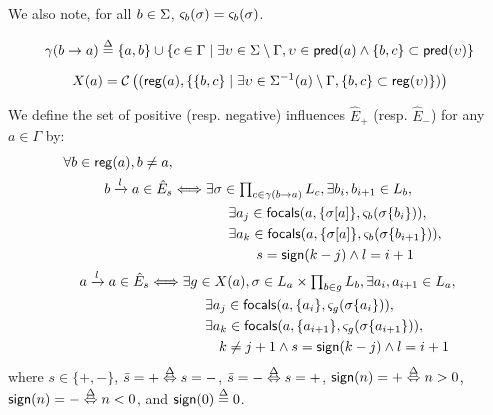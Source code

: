 We also note, for all $b \in \Sigma$, $\varsigma_{b}(\sigma) = \varsigma_b(\sigma)$.

\begin{equation}
\gamma(b\rightarrow a)  \stackrel{\Delta}= \{ a, b \} \cup \{ c \in \Gamma \mid
                        \exists \upsilon\in\Sigma\setminus\Gamma,
                                \upsilon\in\mathsf{pred}(a) \wedge \{b,c\}\subset\mathsf{pred}(\upsilon) \}
\label{eq:cooperating-with-b}
\end{equation}

\begin{equation}
X(a) = \mathcal C\left( (\mathsf{reg}({a}), \{ \{b,c\} \mid
                                \exists \upsilon\in \Sigma^{-1}(a) \setminus \Gamma,
                                        \{b,c\} \subset \mathsf{reg}({\upsilon}) \}) \right)
\label{eq:influence-groups}
\end{equation}


\begin{proposition}\label{pps:inference-edges}
We define the set of positive (resp. negative) influences $\hat{E}_+$ (resp. $\hat{E}_-$) for any
$a\in\Gamma$ by:
\begin{align}
\begin{split}
\forall b\in\mathsf{reg}({a}), b\neq a, \\
b\xrightarrow l a \in \hat{E}_s & \Longleftrightarrow
 \exists \sigma\in\textstyle\prod_{c\in\gamma(b\rightarrow a)} L_c, \exists b_i,b_{i+1}\in L_b,\\
& \qquad\qquad
        \exists a_{j}\in\mathsf{focals}(a, \{\sigma[a]\}, \varsigma_b(\sigma\{b_i\})), \\
& \qquad\qquad
        \exists a_{k}\in\mathsf{focals}(a, \{\sigma[a]\}, \varsigma_b(\sigma\{b_{i+1}\})), \\
& \qquad\qquad\qquad
                        s = \mathsf{sign}(k - j) \wedge l = i+1
\end{split}
\label{eq:edges-inference-b}
\\
\begin{split}
a \xrightarrow l a \in \hat{E}_s & \Longleftrightarrow
\exists g \in X(a), \sigma \in L_a\times \textstyle\prod_{b\in g} L_b,
                        \exists a_i,a_{i+1}\in L_a, \\
& \qquad\qquad
        \exists a_{j}\in\mathsf{focals}(a, \{a_i\}, \varsigma_g(\sigma\{a_i\})), \\
& \qquad\qquad
        \exists a_{k}\in\mathsf{focals}(a, \{a_{i+1}\},  \varsigma_g(\sigma\{a_{i+1}\})), \\
& \qquad\qquad\quad
                        k \neq j+1
                                \wedge s = \mathsf{sign}(k - j) \wedge l = i+1
\end{split}
\label{eq:edges-inference-a}
\end{align}
where $s \in \{ +, - \}$, $\bar s = + \stackrel{\Delta}\Leftrightarrow s = -$, $\bar s = - \stackrel{\Delta}\Leftrightarrow s = +$,
$\mathsf{sign}(n) = + \stackrel{\Delta}\Leftrightarrow n > 0$,
$\mathsf{sign}(n) = - \stackrel{\Delta}\Leftrightarrow n < 0$,
and $\mathsf{sign}(0) \stackrel{\Delta}= 0$.
\end{proposition}

